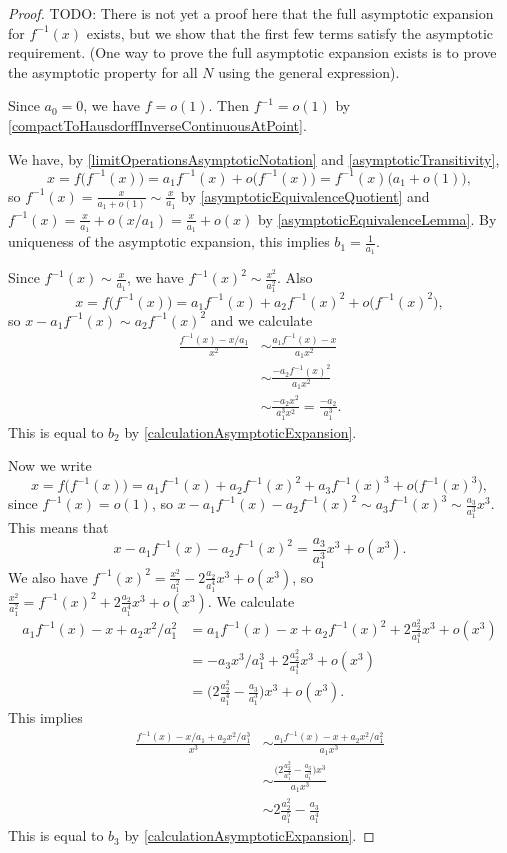 \begin{proof}
TODO: There is not yet a proof here that the full asymptotic expansion for $f^{-1}(x)$ exists, but we show that the first few terms satisfy the asymptotic requirement. (One way to prove the full asymptotic expansion exists is to prove the asymptotic property for all $N$ using the general expression).

Since $a_0 = 0$, we have $f = o(1)$. Then $f^{-1} = o(1)$ by \ref{compactToHausdorffInverseContinuousAtPoint}.

We have, by \ref{limitOperationsAsymptoticNotation} and \ref{asymptoticTransitivity},
\[ x = f\big(f^{-1}(x)\big) = a_1 f^{-1}(x) + o\big(f^{-1}(x)\big) = f^{-1}(x)\big(a_1 + o(1)\big), \]
so $f^{-1}(x) = \frac{x}{a_1 + o(1)} \sim \frac{x}{a_1}$ by \ref{asymptoticEquivalenceQuotient} and $f^{-1}(x) = \frac{x}{a_1} + o(x/a_1) = \frac{x}{a_1} + o(x)$ by \ref{asymptoticEquivalenceLemma}. By uniqueness of the asymptotic expansion, this implies $b_1 = \frac{1}{a_1}$.

Since $f^{-1}(x) \sim \frac{x}{a_1}$, we have $f^{-1}(x)^2 \sim \frac{x^2}{a_1^2}$. Also
\[ x = f\big(f^{-1}(x)\big) = a_1f^{-1}(x) + a_2f^{-1}(x)^2 + o\big(f^{-1}(x)^2\big), \]
so $x - a_1f^{-1}(x) \sim a_2f^{-1}(x)^2$ and we calculate
\begin{align*}
\frac{f^{-1}(x) - x/a_1}{x^2} &\sim \frac{a_1f^{-1}(x) - x}{a_1x^2} \\
&\sim \frac{-a_2f^{-1}(x)^2}{a_1x^2} \\
&\sim \frac{-a_2x^2}{a_1^3x^2} = \frac{-a_2}{a_1^3}.
\end{align*}
This is equal to $b_2$ by \ref{calculationAsymptoticExpansion}.

Now we write
\[ x = f\big(f^{-1}(x)\big) = a_1f^{-1}(x) + a_2f^{-1}(x)^2 + a_3f^{-1}(x)^3 + o\big(f^{-1}(x)^3\big), \]
since $f^{-1}(x) = o(1)$, so $x - a_1f^{-1}(x) - a_2f^{-1}(x)^2 \sim a_3f^{-1}(x)^3 \sim \frac{a_3}{a_1^3}x^3$. This means that
\[ x - a_1f^{-1}(x) - a_2f^{-1}(x)^2 = \frac{a_3}{a_1^3}x^3 + o(x^3). \]
We also have $f^{-1}(x)^2 = \frac{x^2}{a_1^2} - 2 \frac{a_2}{a_1^4}x^3 + o(x^3)$, so $\frac{x^2}{a_1^2} = f^{-1}(x)^2 + 2 \frac{a_2}{a_1^4}x^3 + o(x^3)$. We calculate
\begin{align*}
a_1f^{-1}(x) - x + a_2x^2/a_1^{2} &= a_1f^{-1}(x) - x + a_2f^{-1}(x)^2 + 2 \frac{a_2^2}{a_1^4}x^3 + o(x^3) \\
&= -a_3x^3/ a_1^3 + 2 \frac{a_2^2}{a_1^4}x^3 + o(x^3) \\
&= \Big(2 \frac{a_2^2}{a_1^4} - \frac{a_3}{a_1^3}\Big)x^3 + o(x^3).
\end{align*}
This implies
\begin{align*}
\frac{f^{-1}(x) - x/a_1 + a_2x^2/a_1^{3}}{x^3} &\sim \frac{a_1f^{-1}(x) - x + a_2x^2 / a_1^2}{a_1x^3} \\
&\sim \frac{\Big(2 \frac{a_2^2}{a_1^4} - \frac{a_3}{a_1^3}\Big)x^3}{a_1x^3} \\
&\sim 2 \frac{a_2^2}{a_1^5} - \frac{a_3}{a_1^4}
\end{align*}
This is equal to $b_3$ by \ref{calculationAsymptoticExpansion}.


\end{proof}
